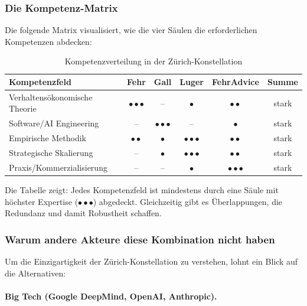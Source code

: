 \subsubsection{Die Kompetenz-Matrix}

Die folgende Matrix visualisiert, wie die vier Säulen die erforderlichen Kompetenzen abdecken:

\begin{table}[h]
\centering
\caption{Kompetenzverteilung in der Zürich-Konstellation}
\label{tab:kompetenzmatrix}
\begin{tabular}{@{}lccccc@{}}
\toprule
\textbf{Kompetenzfeld} & \textbf{Fehr} & \textbf{Gall} & \textbf{Luger} & \textbf{FehrAdvice} & \textbf{Summe} \\
\midrule
Verhaltensökonomische Theorie & $\bullet\bullet\bullet$ & -- & $\bullet$ & $\bullet\bullet$ & stark \\
Software/AI Engineering & -- & $\bullet\bullet\bullet$ & -- & $\bullet$ & stark \\
Empirische Methodik & $\bullet\bullet$ & $\bullet$ & $\bullet\bullet\bullet$ & $\bullet\bullet$ & stark \\
Strategische Skalierung & -- & $\bullet$ & $\bullet\bullet\bullet$ & $\bullet\bullet$ & stark \\
Praxis/Kommerzialisierung & -- & -- & $\bullet$ & $\bullet\bullet\bullet$ & stark \\
\bottomrule
\end{tabular}
\end{table}

Die Tabelle zeigt: Jedes Kompetenzfeld ist mindestens durch eine Säule mit höchster Expertise ($\bullet\bullet\bullet$) abgedeckt. Gleichzeitig gibt es Überlappungen, die Redundanz und damit Robustheit schaffen.

\subsubsection{Warum andere Akteure diese Kombination nicht haben}

Um die Einzigartigkeit der Zürich-Konstellation zu verstehen, lohnt ein Blick auf die Alternativen:

\paragraph{Big Tech (Google DeepMind, OpenAI, Anthropic).}

